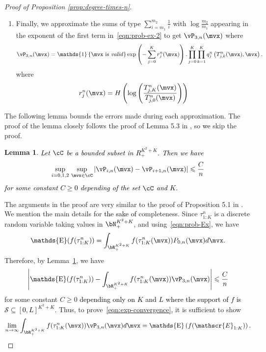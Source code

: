 \documentclass[letterpaper,11pt,reqno]{amsart}
\newtheorem{lem}[thm]{Lemma}
\theoremstyle{definition}
\renewcommand{\leq}{\leqslant}
\renewcommand{\geq}{\geqslant}
\newcommand{\ind}{\mathds{1}}
\newcommand{\set}[1]{\left\{#1\right\}}
\newcommand{\sE}{\mathscr{E}}
\DeclareMathOperator{\E}{\mathds{E}}
\begin{document}
\begin{proof}[Proof of Proposition \ref{prop:degree-times-n}]
\begin{enumerate}
\item  Finally, we approximate the sums of type $\sum\limits_{i=m_1}^{m_2}\frac{1}{i}$ with $\log\frac{m_2}{m_1}$ appearing in the exponent of the first term in~\eqref{eqn:prob-ex-2} to get $\vP_{3,n}(\mvx)$ where \begin{align}\label{eqn:prob-ex-3}
        \vP_{3,n}(\mvx) = \ind\set{\mvx \text{ is \emph{valid}}} \exp\left(-\sum\limits_{j=0}^K r_j^n(\mvx)\right)  . \prod_{j=0}^{K}\prod_{k=1}^K q_{j}^n\left(T_{j,k}^n(\mvx),\mvx\right).
    \end{align} where \begin{align}\label{eqn:r_j-defn}
        r^n_j(\mvx) = H\left(\log\left(\frac{T_{j,K}^n(\mvx)}{T_{j,0}^n(\mvx)}\right)\right) 
    \end{align} 
\end{enumerate} The following lemma bounds the errors made during each approximation. The proof of the lemma closely follows the proof of Lemma 5.3 in \cite{BBDS04_macro}, so \textcolor{black}{we} skip the proof.  
\begin{lem}\label{lem:bigggg-lemma}\textcolor{black}{Let $\cC$ be a bounded subset in $R_{+}^{K^2+K}$. Then we have 
\begin{align*}
    \sup_{i=0,1,2} \, \sup_{\mvx \in \cC}\left|\vP_{i,n}(\mvx) - \vP_{i+1,n}(\mvx) \right|\leq  \frac{C}{n}
\end{align*}for some constant $C \geq 0$ depending of the set $\cC$ and $K$.}
\end{lem}

 The arguments in the proof are very similar to the proof of Proposition 5.1 in \cite{BBDS04_macro}. We mention the main details for \textcolor{black}{the sake of} completeness. Since $\tau^n_{1:K}$ is a discrete random variable taking values in $\bN_+^{K^2+K}$, and using~\eqref{eqn:prob-Ex}, we have $$
    \E(f(\tau^n_{1:K})) = \int_{\bR_+^{K^2 + K}} f(\tau^n_{1:K}(\mvx)) P_{0,n}(\mvx)d\mvx. $$ Therefore, by Lemma~\ref{lem:bigggg-lemma}, we have \begin{align*}
    \left|\E(f(\tau^n_{1:K})) - \int_{\bR_+^{K^2+K}}f(\tau^n_{1:K}(\mvx))\vP_{3,n}(\mvx)\right| \leq \frac{C}{n}
\end{align*} for some constant $C \geq 0$ \textcolor{black}{depending only on $K$ and $L$ where the support of $f$ is $\mathcal{S} \subseteq[0,L]^{K^2 + K}$}. Thus, to prove~\eqref{eqn:exp-convergence}, it is sufficient to show \begin{align}\label{eqn:sufficient-condition}
    \lim\limits_{n\to \infty}\int_{\bR_+^{K^2+K}} f(\tau^n_{1:K}(\mvx)) \vP_{3,n}(\mvx)d\mvx  = \E\left(f(\sE_{1:K})\right).
\end{align}


\end{proof}
\end{document}
